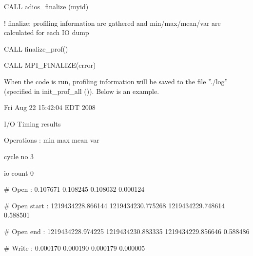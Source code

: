 \vspace{36pt}
CALL adios\_finalize (myid)

\vspace{23pt}
! finalize; profiling information are gathered and min/max/mean/var are calculated 
for each IO dump

\vspace{10pt}
CALL finalize\_prof()

\vspace{23pt}
CALL MPI\_FINALIZE(error)


\vspace{23pt}
When the code is run, profiling information will be saved to the file ''./log'' 
(specified in init\_prof\_all ()). Below is an example.

\vspace{10pt}
{\small Fri Aug 22 15:42:04 EDT 2008}

\vspace{10pt}
{\small I/O Timing results}

\vspace{10pt}
{\small Operations    :          min                     max                   
  mean                    var}

\vspace{10pt}
{\small cycle no         3}

\vspace{10pt}
{\small io count         0}

\vspace{10pt}
{\small \# Open        :          0.107671                0.108245             
   0.108032                0.000124}

\vspace{10pt}
{\small \# Open start  :          1219434228.866144       1219434230.775268    
   1219434229.748614       0.588501}

\vspace{10pt}
{\small \# Open end    :          1219434228.974225       1219434230.883335    
   1219434229.856646       0.588486}

\vspace{10pt}
{\small \# Write       :          0.000170                0.000190             
   0.000179                0.000005}

